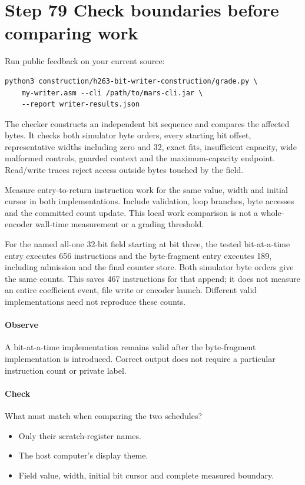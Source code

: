 \section{Step 79 Check boundaries before comparing work}\label{h263-writer-s09}
Run public feedback on your current source:
\begin{verbatim}
python3 construction/h263-bit-writer-construction/grade.py \
    my-writer.asm --cli /path/to/mars-cli.jar \
    --report writer-results.json
\end{verbatim}
The checker constructs an independent bit sequence and compares the affected
bytes. It checks both simulator byte orders, every starting bit offset, representative
widths including zero and 32, exact fits, insufficient capacity, wide malformed
controls, guarded context and the maximum-capacity endpoint. Read/write traces
reject access outside bytes touched by the field.

Measure entry-to-return instruction work for the same value, width and initial
cursor in both implementations. Include validation, loop branches, byte accesses
and the committed count update. This local work comparison is not a whole-encoder
wall-time measurement or a grading threshold.

For the named all-one 32-bit field starting at bit three, the tested bit-at-a-time
entry executes 656 instructions and the byte-fragment entry executes 189, including
admission and the final counter store. Both simulator byte orders give the same
counts. This saves 467 instructions for that append; it does not measure an entire
coefficient event, file write or encoder launch. Different valid implementations
need not reproduce these counts.

\paragraph{Observe} A bit-at-a-time implementation remains valid after the
byte-fragment implementation is introduced. Correct output does not require a
particular instruction count or private label.
\Needspace{8\baselineskip}
\paragraph{Check} What must match when comparing the two schedules?
\begin{itemize}
  \item[A.] Only their scratch-register names.
  \item[B.] The host computer's display theme.
  \item[C.] Field value, width, initial bit cursor and complete measured boundary.
\end{itemize}

